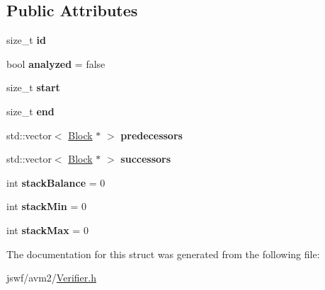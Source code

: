 \subsection*{Public Attributes}
\begin{DoxyCompactItemize}
\item 
\hypertarget{structjswf_1_1avm2_1_1_block_a290876d59bc492ba250354b21688b8db}{size\+\_\+t {\bfseries id}}\label{structjswf_1_1avm2_1_1_block_a290876d59bc492ba250354b21688b8db}

\item 
\hypertarget{structjswf_1_1avm2_1_1_block_a75aec481cf4486cdac7bd3e38398c6e0}{bool {\bfseries analyzed} = false}\label{structjswf_1_1avm2_1_1_block_a75aec481cf4486cdac7bd3e38398c6e0}

\item 
\hypertarget{structjswf_1_1avm2_1_1_block_a9ef0c80f44de0a6d6070cbdd29dcb8f2}{size\+\_\+t {\bfseries start}}\label{structjswf_1_1avm2_1_1_block_a9ef0c80f44de0a6d6070cbdd29dcb8f2}

\item 
\hypertarget{structjswf_1_1avm2_1_1_block_ae9bb52bb058c2d5af26d3d93f3673123}{size\+\_\+t {\bfseries end}}\label{structjswf_1_1avm2_1_1_block_ae9bb52bb058c2d5af26d3d93f3673123}

\item 
\hypertarget{structjswf_1_1avm2_1_1_block_a6b54112adfc2757fc0b401de5e32d5eb}{std\+::vector$<$ \hyperlink{structjswf_1_1avm2_1_1_block}{Block} $\ast$ $>$ {\bfseries predecessors}}\label{structjswf_1_1avm2_1_1_block_a6b54112adfc2757fc0b401de5e32d5eb}

\item 
\hypertarget{structjswf_1_1avm2_1_1_block_ad00b93c78fadd59af5f4a4387e6a81a5}{std\+::vector$<$ \hyperlink{structjswf_1_1avm2_1_1_block}{Block} $\ast$ $>$ {\bfseries successors}}\label{structjswf_1_1avm2_1_1_block_ad00b93c78fadd59af5f4a4387e6a81a5}

\item 
\hypertarget{structjswf_1_1avm2_1_1_block_a64c986144de01fb844d2c382d01659d8}{int {\bfseries stack\+Balance} = 0}\label{structjswf_1_1avm2_1_1_block_a64c986144de01fb844d2c382d01659d8}

\item 
\hypertarget{structjswf_1_1avm2_1_1_block_a6374ab7364ec35c54e6851a94b1e4a7a}{int {\bfseries stack\+Min} = 0}\label{structjswf_1_1avm2_1_1_block_a6374ab7364ec35c54e6851a94b1e4a7a}

\item 
\hypertarget{structjswf_1_1avm2_1_1_block_a2bc6f951b252abfce8217d3ab30671d5}{int {\bfseries stack\+Max} = 0}\label{structjswf_1_1avm2_1_1_block_a2bc6f951b252abfce8217d3ab30671d5}

\end{DoxyCompactItemize}


The documentation for this struct was generated from the following file\+:\begin{DoxyCompactItemize}
\item 
jswf/avm2/\hyperlink{_verifier_8h}{Verifier.\+h}\end{DoxyCompactItemize}
